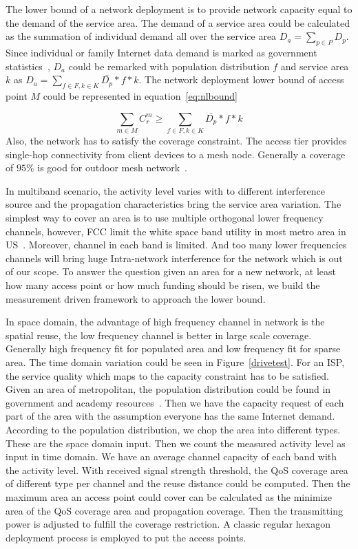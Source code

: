 The lower bound of a network deployment is to provide network capacity equal to the demand of the service 
area. The demand of a service area could be calculated as the summation of individual demand all over 
the service area $D_a=\sum_{p\in P}D_p$. Since individual or family Internet data demand is marked as government 
statistics~\cite{rosston2011household}, $D_a$ could be remarked with population distribution $f$ and service area $k$ as 
$D_a=\sum_{f \in F,k \in K}\bar{D_p}*f*k$. The network deployment lower bound of access point $M$ could be 
represented in equation~\ref{eq:nlbound}

\begin{equation}
\label{eq:nlbound}
\sum_{m \in M}C_r^m \ge \sum_{f \in F,k \in K}\bar{D_p}*f*k
\end{equation}
Also, the network has to satisfy the coverage constraint. The access tier provides 
single-hop connectivity from client devices to a mesh node. 
Generally a coverage of $95\%$ is good for outdoor mesh network~\cite{robinson2010deploying}.

In multiband scenario, the activity level varies with to different interference source and the propagation
 characteristics bring the service area variation. The simplest way to cover an area is to use 
 multiple orthogonal lower frequency channels, however, FCC limit the white space band utility in 
 most metro area in US~\cite{googledatabase}. Moreover, channel in each band is limited. 
 And too many lower frequencies channels will bring  huge Intra-network interference for 
 the network which is out of our scope. To answer the question given an area for a new network, 
 at least how many access point or how much funding should be risen, we build the measurement driven
  framework to approach the lower bound.




In space domain, the advantage of high frequency channel in network is the spatial reuse, the low
frequency channel is better in large scale coverage. Generally high frequency fit
for populated area and low frequency fit for sparse area.
The time domain variation could be seen in Figure~\ref{drivetest}.
For an ISP, the service quality which maps to the capacity constraint has to be satisfied.
Given an area of metropolitan, the population distribution could be found in 
government and academy resources~\cite{uscensus}. Then we have the capacity request
of each part of the area with the assumption everyone has the same Internet demand. 
According to the population distribution, we chop the area into different types.
These are the space domain input. Then we count the measured activity level as 
input in time domain. We have an average channel capacity of each band with the 
activity level. With received signal strength threshold, 
the QoS coverage area of different type per channel and the reuse distance could be computed. 
Then the maximum area an access point could cover can be calculated as the minimize 
area of the QoS coverage area and propagation coverage.
Then the transmitting power is adjusted to fulfill the coverage restriction. 
A classic regular hexagon deployment process is employed to put the access points.


